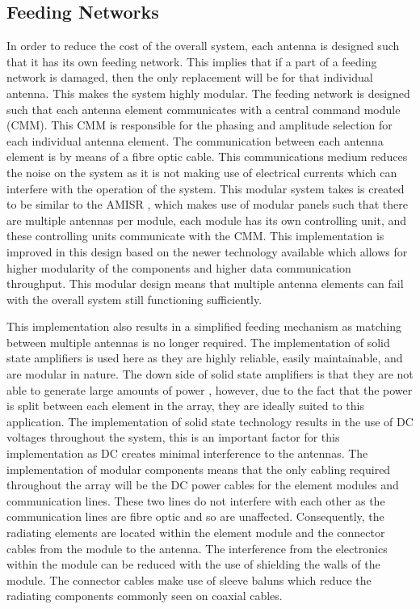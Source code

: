 \documentclass[11pt]{witseiepaper}
\begin{document}


\subsection{Feeding Networks} \label{sec:FeedingNetworks}
In order to reduce the cost of the overall system, each antenna is designed such that it has its own feeding network. This implies that if a part of a feeding network is damaged, then the only replacement will be for that individual antenna. This makes the system highly modular. 
The feeding network is designed such that each antenna element communicates with a central command module (CMM). This CMM is responsible for the phasing and amplitude selection for each individual antenna element.
The communication between each antenna element is by means of a fibre optic cable. This communications medium reduces the noise on the system as it is not making use of electrical currents which can interfere with the operation of the system. 
This modular system takes is created to be similar to the AMISR \cite{AMISR}, which makes use of modular panels such that there are multiple antennas per module, each module has its own controlling unit, and these controlling units communicate with the CMM.
This implementation is improved in this design based on the newer technology available which allows for higher modularity of the components and higher data communication throughput.
This modular design means that multiple antenna elements can fail with the overall system still functioning sufficiently.

This implementation also results in a simplified feeding mechanism as matching between multiple antennas is no longer required.
The implementation of solid state amplifiers is used here as they are highly reliable, easily maintainable, and are modular in nature. The down side of solid state amplifiers is that they are not able to generate large amounts of power \cite[p.~364]{radarHandbook}, however, due to the fact that the power is split between each element in the array, they are ideally suited to this application. The implementation of solid state technology results in the use of DC voltages throughout the system, this is an important factor for this implementation as DC creates minimal interference to the antennas.
The implementation of modular components means that the only cabling required throughout the array will be the DC power cables for the element modules and communication lines. These two lines do not interfere with each other as the communication lines are fibre optic and so are unaffected.
Consequently, the radiating elements are located within the element module and the connector cables from the module to the antenna.
The interference from the electronics within the module can be reduced with the use of shielding the walls of the module. The connector cables make use of sleeve baluns which reduce the radiating components commonly seen on coaxial cables.
\end{document}
